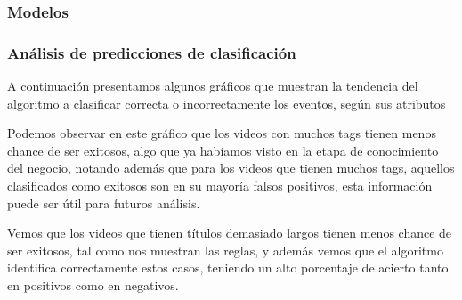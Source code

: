     \subsubsection{Modelos}

        \def\RUN{1}
        \def\title{Resultados de la corrida 1 del arbol de decisión J48}
        \def\algorithm{weka}
        \def\numberOfRules{17}
        \def\hasRules{1}
        
        \newpage

        \def\RUN{2}
        \def\title{Resultados de la corrida 2 del arbol de decisión J48}
        \def\algorithm{weka}
        \def\numberOfRules{20}
        \def\hasRules{1}
        
        \newpage

        \def\RUN{1}
        \def\title{Resultados de la corrida de Perceptron}
        \def\algorithm{perceptron}
        \def\numberOfRules{20}
        \def\hasRules{0}
        

    \subsubsection{Análisis de predicciones de clasificación}

        A continuación presentamos algunos gráficos que muestran la tendencia
        del algoritmo a clasificar correcta o incorrectamente los eventos, según
        sus atributos

        \def\path{clasif_error_tags_length.png}
        \def\text{Clasif. Errors vs tag length}
        \def\scale{.7}
        

        Podemos observar en este gráfico que los videos con muchos tags tienen
        menos chance de ser exitosos, algo que ya habíamos visto en la etapa de
        conocimiento del negocio, notando además que para los videos que tienen
        muchos tags, aquellos clasificados como exitosos son en su mayoría
        falsos positivos, esta información puede ser útil para futuros análisis.

        \def\path{clasif_error_title_length.png}
        \def\text{Clasif. errors vs title length}
        \def\scale{.7}
        

        Vemos que los videos que tienen títulos demasiado largos tienen menos
        chance de ser exitosos, tal como nos muestran las reglas, y además vemos
        que el algoritmo identifica correctamente estos casos, teniendo un alto
        porcentaje de acierto tanto en positivos como en negativos.


